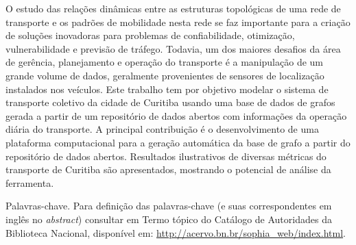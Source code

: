 
\begin{resumoutfpr}%
O estudo das relações dinâmicas entre as estruturas topológicas de uma rede de transporte e os padrões de mobilidade nesta rede se faz importante para a criação de soluções inovadoras para problemas de confiabilidade, otimização, vulnerabilidade e previsão de tráfego. Todavia, um dos maiores desafios da área de gerência, planejamento e operação do transporte é a manipulação de um grande volume de dados, geralmente provenientes de sensores de localização instalados nos veículos. Este trabalho tem por objetivo modelar o sistema de transporte coletivo da cidade de Curitiba usando uma base de dados de grafos gerada a partir de um repositório de dados abertos com informações da operação diária do transporte. A principal contribuição é o desenvolvimento de uma plataforma computacional para a geração automática da base de grafo a partir do repositório de dados abertos. Resultados ilustrativos de diversas métricas do transporte de Curitiba são apresentados, mostrando o potencial de análise da ferramenta.

Palavras-chave. Para definição das palavras-chave (e suas correspondentes em inglês no \textit{abstract}) consultar em Termo tópico do Catálogo de Autoridades da Biblioteca Nacional, disponível em: \url{http://acervo.bn.br/sophia_web/index.html}.
\end{resumoutfpr}
